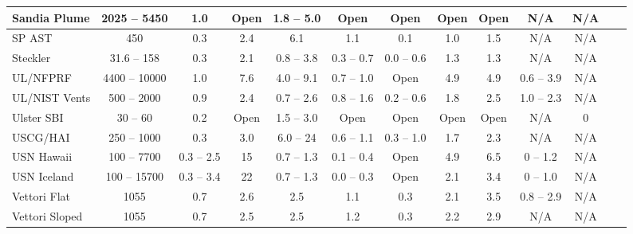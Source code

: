 \begin{table}
\begin{center}
\begin{tabular}{|l|c|c|c|c|c|c|c|c|c|c|c|c|}
Sandia Plume        & 2025 -- 5450  & 1.0           & Open  & 1.8 -- 5.0        & Open                & Open          & Open        & Open        & N/A                   & N/A                   \\ \hline
SP AST              & 450           & 0.3           & 2.4   & 6.1               & 1.1                 & 0.1           & 1.0         & 1.5         & N/A                   & N/A                   \\ \hline
Steckler            & 31.6 -- 158   & 0.3           & 2.1   & 0.8 -- 3.8        & 0.3 -- 0.7          & 0.0 -- 0.6    & 1.3         & 1.3         & N/A                   & N/A                   \\ \hline
UL/NFPRF            & 4400 -- 10000 & 1.0           & 7.6   & 4.0 -- 9.1        & 0.7 -- 1.0          & Open          & 4.9         & 4.9         & 0.6 -- 3.9            & N/A                   \\ \hline
UL/NIST Vents       & 500 -- 2000   & 0.9           & 2.4   & 0.7 -- 2.6        & 0.8 -- 1.6          & 0.2 -- 0.6    & 1.8         & 2.5         & 1.0 -- 2.3            & N/A                   \\ \hline
Ulster SBI          & 30 -- 60      & 0.2           & Open  & 1.5 -- 3.0        & Open                & Open          & Open        & Open        & N/A                   & 0                     \\ \hline
USCG/HAI            & 250 -- 1000   & 0.3           & 3.0   & 6.0 -- 24         & 0.6 -- 1.1          & 0.3 -- 1.0    & 1.7         & 2.3         & N/A                   & N/A                   \\ \hline
USN Hawaii          & 100 -- 7700   & 0.3 -- 2.5    & 15    & 0.7 -- 1.3        & 0.1 -- 0.4          & Open          & 4.9         & 6.5         & 0 -- 1.2              & N/A                   \\ \hline
USN Iceland         & 100 -- 15700  & 0.3 -- 3.4    & 22    & 0.7 -- 1.3        & 0.0 -- 0.3          & Open          & 2.1         & 3.4         & 0 -- 1.0              & N/A                   \\ \hline
Vettori Flat        & 1055          & 0.7           & 2.6   & 2.5               & 1.1                 & 0.3           & 2.1         & 3.5         & 0.8 -- 2.9            & N/A                   \\ \hline
Vettori Sloped      & 1055          & 0.7           & 2.5   & 2.5               & 1.2                 & 0.3           & 2.2         & 2.9         & N/A                   & N/A                   \\ \hline

\end{tabular}
\end{center}
\end{table}
